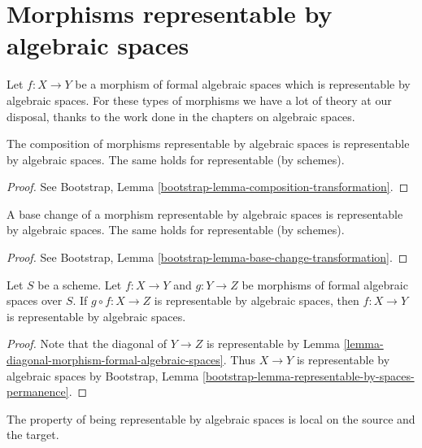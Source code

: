 \section{Morphisms representable by algebraic spaces}
\label{section-representable}

\noindent
Let $f : X \to Y$ be a morphism of formal algebraic spaces which
is representable by algebraic spaces. For these types of morphisms
we have a lot of theory at our disposal, thanks to the work done
in the chapters on algebraic spaces.

\begin{lemma}
\label{lemma-composition-representable}
The composition of morphisms representable by algebraic spaces is
representable by algebraic spaces. The same holds for representable
(by schemes).
\end{lemma}

\begin{proof}
See Bootstrap, Lemma \ref{bootstrap-lemma-composition-transformation}.
\end{proof}

\begin{lemma}
\label{lemma-base-change-representable}
A base change of a morphism representable by algebraic spaces is
representable by algebraic spaces. The same holds for representable
(by schemes).
\end{lemma}

\begin{proof}
See Bootstrap, Lemma \ref{bootstrap-lemma-base-change-transformation}.
\end{proof}

\begin{lemma}
\label{lemma-permanence-representable}
Let $S$ be a scheme. Let $f : X \to Y$ and $g : Y \to Z$ be morphisms of
formal algebraic spaces over $S$. If $g \circ f : X \to Z$ is representable
by algebraic spaces, then $f : X \to Y$ is representable by algebraic spaces.
\end{lemma}

\begin{proof}
Note that the diagonal of $Y \to Z$ is representable by
Lemma \ref{lemma-diagonal-morphism-formal-algebraic-spaces}.
Thus $X \to Y$ is representable by algebraic spaces by
Bootstrap, Lemma \ref{bootstrap-lemma-representable-by-spaces-permanence}.
\end{proof}

\noindent
The property of being representable by algebraic spaces is local on the
source and the target.

